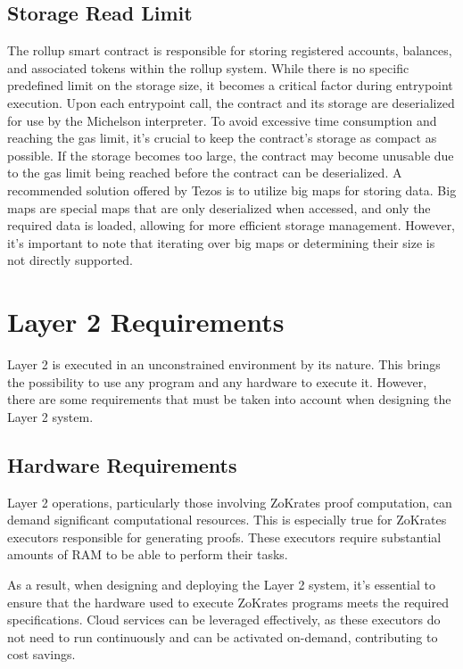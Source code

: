 \subsection{Storage Read Limit}

The rollup smart contract is responsible for storing registered accounts, balances, and associated tokens within the rollup system. While there is no specific predefined limit on the storage size, it becomes a critical factor during entrypoint execution. Upon each entrypoint call, the contract and its storage are deserialized for use by the Michelson interpreter. To avoid excessive time consumption and reaching the gas limit, it's crucial to keep the contract's storage as compact as possible. If the storage becomes too large, the contract may become unusable due to the gas limit being reached before the contract can be deserialized. A recommended solution offered by Tezos is to utilize big maps for storing data. Big maps are special maps that are only deserialized when accessed, and only the required data is loaded, allowing for more efficient storage management. However, it's important to note that iterating over big maps or determining their size is not directly supported.

\section{Layer 2 Requirements}

Layer 2 is executed in an unconstrained environment by its nature. This brings the possibility to use any program and any hardware to execute it. However, there are some requirements that must be taken into account when designing the Layer 2 system.

\subsection{Hardware Requirements}

Layer 2 operations, particularly those involving ZoKrates proof computation, can demand significant computational resources. This is especially true for ZoKrates executors responsible for generating proofs. These executors require substantial amounts of RAM to be able to perform their tasks.

As a result, when designing and deploying the Layer 2 system, it's essential to ensure that the hardware used to execute ZoKrates programs meets the required specifications. Cloud services can be leveraged effectively, as these executors do not need to run continuously and can be activated on-demand, contributing to cost savings.

